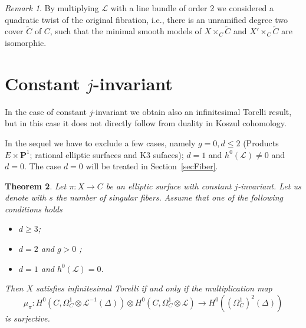 \documentclass{amsart}
\newcommand{\Ps}{\mathbf{P}}
\newcommand{\cL}{\mathcal{L}}
\newtheorem{theorem}{Theorem}[section]
\theoremstyle{definition}
\theoremstyle{remark}
\newtheorem{remark}[theorem]{Remark}
\begin{document}
\begin{remark} By multiplying $\cL$ with a  line bundle of order 2 we considered a quadratic twist of the original fibration, i.e., there is an unramified degree two cover $\tilde{C}$ of $C$, such that the minimal smooth models of $X\times_C \tilde{C}$ and $X'\times_C\tilde{C}$ are isomorphic.
\end{remark}

\section{Constant $j$-invariant} \label{secCst}
In the case of constant $j$-invariant we obtain also an infinitesimal Torelli result, but in this case it does not directly follow from duality in Koszul cohomology.

In the sequel we have to exclude a few cases, namely $g=0, d\leq 2$ (Products $E\times \Ps^1$; rational elliptic surfaces and K3 sufaces); $d=1$ and $h^0(\cL)\neq 0$ and $d=0$. The case $d=0$ will be treated in Section~\ref{secFiber}.

\begin{theorem}\label{prpRedKos} Let $\pi: X \to C$ be an elliptic surface with constant $j$-invariant. Let us denote with $s$ the number of singular fibers. 
Assume that one of the following conditions holds
\begin{itemize}
\item $d\geq 3$; 
\item $d=2$ and $g>0$ ;
\item $d=1$ and $h^0(\cL)=0$.\end{itemize}
Then $X$ satisfies infinitesimal Torelli  if and only if the multiplication map
\begin{equation}\label{eqnCupCst}
\mu_{\pi} : H^0(C,\Omega^1_C\otimes \cL^{-1}(\Delta))\otimes H^0(C,\Omega^1_C\otimes \cL)\to H^0((\Omega^1_C)^2(\Delta))
\end{equation}
is surjective.
\end{theorem}
\end{document}
